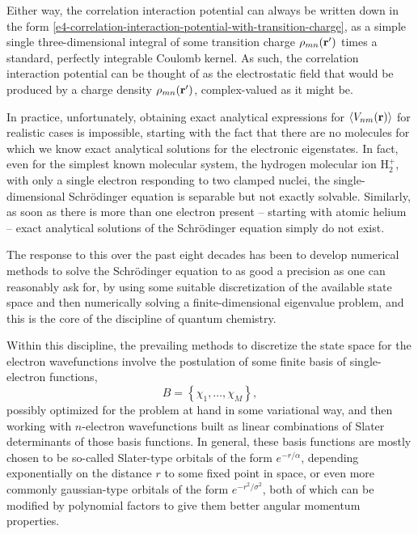 Either way, the correlation interaction potential can always be written down in the form \eqref{e4-correlation-interaction-potential-with-transition-charge}, as a simple single three-dimensional integral of some transition charge $\rho_{mn}(\vb{r}')$ times a standard, perfectly integrable Coulomb kernel. As such, the correlation interaction potential can be thought of as the electrostatic field that would be produced by a charge density $\rho_{mn}(\vb{r}')$, complex-valued as it might be.



In practice, unfortunately, obtaining exact analytical expressions for $\left\langle V_{nm}\mathopen{}\left( \vb{r} \right)\mathclose{} \right\rangle$ for realistic cases is impossible, starting with the fact that there are no molecules for which we know exact analytical solutions for the electronic eigenstates. In fact, even for the simplest known molecular system, the hydrogen molecular ion H$_2^+$, with only a single electron responding to two clamped nuclei, the single-dimensional Schrödinger equation is separable but not exactly solvable. Similarly, as soon as there is more than one electron present -- starting with atomic helium -- exact analytical solutions of the Schrödinger equation simply do not exist.

The response to this over the past eight decades has been to develop numerical methods to solve the Schrödinger equation to as good a precision as one can reasonably ask for, by using some suitable discretization of the available state space and then numerically solving a finite-dimensional eigenvalue problem, and this is the core of the discipline of quantum chemistry. 

Within this discipline, the prevailing methods to discretize the state space for the electron wavefunctions involve the postulation of some finite basis of single-electron functions,
\begin{equation}
B=\left\{\chi_1,\ldots,\chi_M\right\},
\end{equation}
possibly optimized for the problem at hand in some variational way, and then working with $n$-electron wavefunctions built as linear combinations of Slater determinants of those basis functions. In general, these basis functions are mostly chosen to be so-called Slater-type orbitals of the form $e^{-r/\alpha}$, depending exponentially on the distance $r$ to some fixed point in space, or even more commonly gaussian-type orbitals of the form $e^{-r^2/\sigma^2}$, both of which can be modified by polynomial factors to give them better angular momentum properties.

